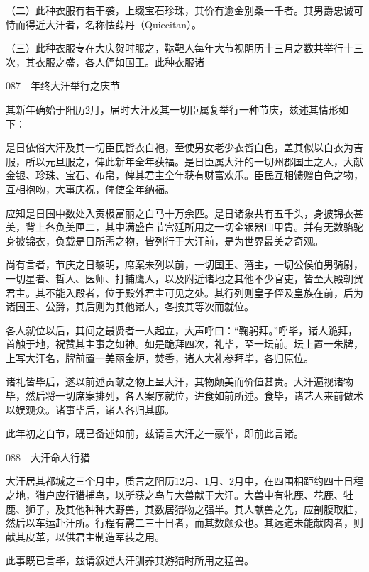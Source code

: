 \documentclass[12pt,UTF8]{ctexbook}
\begin{document}
（二）此种衣服有若干袭，上缀宝石珍珠，其价有逾金别桑一千者。其男爵忠诚可恃而得近大汗者，名称怯薛丹（Quiecitan）。

（三）此种衣服专在大庆贺时服之，鞑靼人每年大节视阴历十三月之数共举行十三次，其衣服之盛，各人俨如国王。此种衣服诸





087　年终大汗举行之庆节

其新年确始于阳历2月，届时大汗及其一切臣属复举行一种节庆，兹述其情形如下：

是日依俗大汗及其一切臣民皆衣白袍，至使男女老少衣皆白色，盖其似以白衣为吉服，所以元旦服之，俾此新年全年获福。是日臣属大汗的一切州郡国土之人，大献金银、珍珠、宝石、布帛，俾其君主全年获有财富欢乐。臣民互相馈赠白色之物，互相抱吻，大事庆祝，俾使全年纳福。

应知是日国中数处入贡极富丽之白马十万余匹。是日诸象共有五千头，身披锦衣甚美，背上各负美匣二，其中满盛白节宫廷所用之一切金银器皿甲胄。并有无数骆驼身披锦衣，负载是日所需之物，皆列行于大汗前，是为世界最美之奇观。

尚有言者，节庆之日黎明，席案未列以前，一切国王、藩主，一切公侯伯男骑尉，一切星者、哲人、医师、打捕鹰人，以及附近诸地之其他不少官吏，皆至大殿朝贺君主。其不能入殿者，位于殿外君主可见之处。其行列则皇子侄及皇族在前，后为诸国王、公爵，其后则为其他诸人，各按其等次而就位。

各人就位以后，其间之最贤者一人起立，大声呼曰：“鞠躬拜。”呼毕，诸人跪拜，首触于地，祝赞其主事之如神。如是跪拜四次，礼毕，至一坛前。坛上置一朱牌，上写大汗名，牌前置一美丽金炉，焚香，诸人大礼参拜毕，各归原位。

诸礼皆毕后，遂以前述贡献之物上呈大汗，其物颇美而价值甚贵。大汗遍视诸物毕，然后将一切席案排列，各人案序就位，进食如前所述。食毕，诸艺人来前做术以娱观众。诸事毕后，诸人各归其邸。

此年初之白节，既已备述如前，兹请言大汗之一豪举，即前此言诸。





088　大汗命人行猎

大汗居其都城之三个月中，质言之阳历12月、1月、2月中，在四围相距约四十日程之地，猎户应行猎捕鸟，以所获之鸟与大兽献于大汗。大兽中有牝鹿、花鹿、牡鹿、狮子，及其他种种大野兽，其数居猎物之强半。其人献兽之先，应剖腹取脏，然后以车运赴汗所。行程有需二三十日者，而其数颇众也。其远道未能献肉者，则献其皮革，以供君主制造军装之用。

此事既已言毕，兹请叙述大汗驯养其游猎时所用之猛兽。
\end{document}
